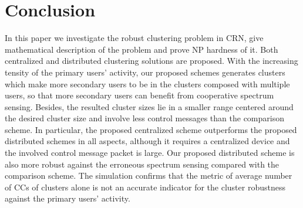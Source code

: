\documentclass[times]{ettauth}
\theoremstyle{mytheoremstyle}
\theoremstyle{mytheoremstyle}
\theoremstyle{mytheoremstyle}
\begin{document}
\section{Conclusion}
\label{conclusion}
In this paper we investigate the robust clustering problem in CRN, give mathematical description of the problem and prove NP hardness of it.
Both centralized and distributed clustering solutions are proposed.
With the increasing tensity of the primary users' activity, our proposed schemes generates clusters which make more secondary users to be in the clusters composed with multiple users, so that more secondary users can benefit from cooperative spectrum sensing. 
Besides, the resulted cluster sizes lie in a smaller range centered around the desired cluster size and involve less control messages than the comparison scheme.
In particular, the proposed centralized scheme outperforms the proposed distributed schemes in all aspects, although it requires a centralized device and the involved control message packet is large.
Our proposed distributed scheme is also more robust against the erroneous spectrum sensing compared with the comparison scheme.
The simulation confirms that the metric of average number of CCs of clusters alone is not an accurate indicator for the cluster robustness against the primary users' activity.

\end{document}
